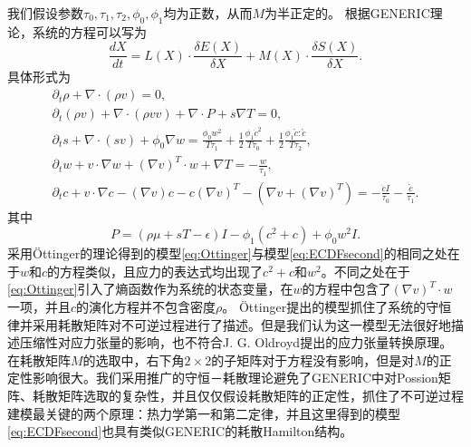 	我们假设参数$\tau_0,\tau_1,\tau_2,\phi_0,\phi_1$均为正数，从而$M$为半正定的。
	根据GENERIC理论，系统的方程可以写为
	\begin{equation*}
		\frac{dX}{dt} = L(X) \cdot \frac{\delta E(X)}{\delta X} + M(X) \cdot \frac{\delta S(X)}{\delta X} .
	\end{equation*}
	具体形式为
	\begin{subequations}\label{eq:Ottinger}
		\begin{align} 
			\partial_t \rho + \nabla \cdot (\rho v) = 0, \\
			\partial_t (\rho v) + \nabla \cdot (\rho v v ) + \nabla \cdot P + s \nabla T = 0, \\
			\partial_t s + \nabla \cdot (s v) + \phi_0  \nabla w = \frac{\phi_0 w^2}{T \tau_1} + \frac{1}{2} \frac{\phi_1 \dot{c}^2}{T \tau_0} + \frac{1}{2} \frac{\phi_1 \mathring{c}:\mathring{c}}{T \tau_2}, \\
			\partial_t w + v \cdot \nabla w + (\nabla v)^T \cdot w + \nabla T  = -\frac{w}{\tau_1}, \\
			\partial_t c + v \cdot \nabla c - (\nabla v) c - c (\nabla v)^T - (\nabla v + (\nabla v)^T) = -\frac{\dot{c}I}{\tau_0} - \frac{\mathring{c}}{\tau_1}.
		\end{align}
	\end{subequations}
	其中
	\begin{equation*}
		P = (\rho \mu + sT - \epsilon) I  - \phi_1(c^2 + c) + \phi_0 w^2 I.
	\end{equation*}
	采用\"Ottinger的理论得到的模型\eqref{eq:Ottinger}与模型\eqref{eq:ECDFsecond}的相同之处在于$w$和$c$的方程类似，且应力的表达式均出现了$c^2+c$和$w^2$。不同之处在于\eqref{eq:Ottinger}引入了熵函数作为系统的状态变量，在$w$的方程中包含了$(\nabla v)^T \cdot w$一项，并且$c$的演化方程并不包含密度$\rho$。
	\"Ottinger提出的模型抓住了系统的守恒律并采用耗散矩阵对不可逆过程进行了描述。但是我们认为这一模型无法很好地描述压缩性对应力张量的影响，也不符合J. G. Oldroyd提出的应力张量转换原理\cite{oldroyd1950formulation}。在耗散矩阵$M$的选取中，右下角$2\times 2$的子矩阵对于方程没有影响，但是对$M$的正定性影响很大。我们采用推广的守恒－耗散理论避免了GENERIC中对Possion矩阵、耗散矩阵选取的复杂性，并且仅仅假设耗散矩阵的正定性，抓住了不可逆过程建模最关键的两个原理：热力学第一和第二定律，并且这里得到的模型\eqref{eq:ECDFsecond}也具有类似GENERIC的耗散Hamilton结构。%

